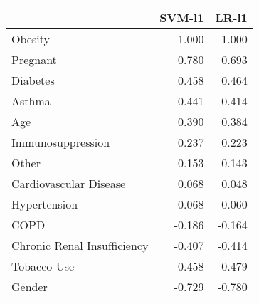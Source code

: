 \begin{tabular}{lrr}
\toprule
{} &  SVM-l1 &  LR-l1 \\
\midrule
Obesity                     &   1.000 &  1.000 \\
Pregnant                    &   0.780 &  0.693 \\
Diabetes                    &   0.458 &  0.464 \\
Asthma                      &   0.441 &  0.414 \\
Age                         &   0.390 &  0.384 \\
Immunosuppression           &   0.237 &  0.223 \\
Other                       &   0.153 &  0.143 \\
Cardiovascular Disease      &   0.068 &  0.048 \\
Hypertension                &  -0.068 & -0.060 \\
COPD                        &  -0.186 & -0.164 \\
Chronic Renal Insufficiency &  -0.407 & -0.414 \\
Tobacco Use                 &  -0.458 & -0.479 \\
Gender                      &  -0.729 & -0.780 \\
\bottomrule
\end{tabular}
